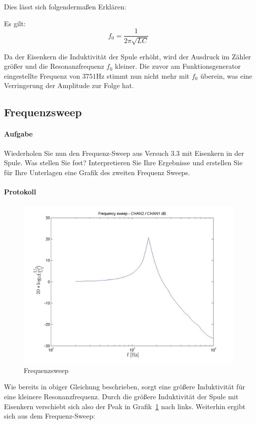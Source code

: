 \documentclass[10pt]{scrreprt}
\begin{document}
        Dies lässt sich
        folgendermaßen Erklären:

        Es gilt:
        \begin{equation}
            f_0 = \frac{1}{2 \pi \sqrt{L C}}
        \end{equation}

        Da der Eisenkern die Induktivität der Spule erhöht, wird der Ausdruck im
        Zähler größer und die Resonanzfrequenz $f_0$ kleiner. Die zuvor am
        Funktionsgenerator eingestellte Frequenz von $3751 \si{\hertz}$ stimmt
        nun nicht mehr mit $f_0$ überein, was eine Verringerung der Amplitude
        zur Folge hat.

        \subsection{Frequenzsweep}
        \paragraph{Aufgabe}
        Wiederholen Sie nun den Frequenz-Sweep aus Versuch 3.3 mit Eisenkern in der
        Spule. Was stellen Sie fest? Interpretieren Sie Ihre Ergebnisse und erstellen Sie für
        Ihre Unterlagen eine Grafik des zweiten Frequenz Sweeps.

        \paragraph{Protokoll}

        \begin{center}
            \begin{figure}[H]
                \includegraphics[width=\textwidth]{F_Sweep_2_frequencysweep_ylogxlog.jpg}
                \caption{Frequenzsweep}
                \label{fig:fsweep2}
            \end{figure}
        \end{center}
        Wie bereits in obiger Gleichung beschrieben, sorgt eine größere Induktivität
        für eine kleinere Resonanzfrequenz. Durch die größere Induktivität der
        Spule mit Eisenkern verschiebt sich also der Peak in Grafik~\ref{fig:fsweep2}
        nach links. Weiterhin ergibt sich aus dem Frequenz-Sweep:
\end{document}
